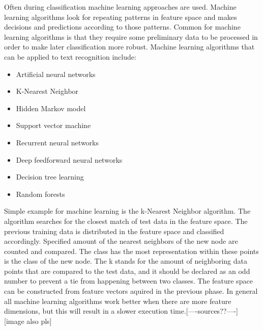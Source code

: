 \documentclass{article}
\begin{document}
        Often during classification machine learning approaches are used. Machine learning algorithms look for repeating patterns in feature space and makes decisions and predictions according to those patterns. Common for machine learning algorithms is that they require some preliminary data to be processed in order to make later classification more robust. Machine learning algorithms that can be applied to text recognition include:
        \begin{itemize}
          \item Artificial neural networks
          \item K-Nearest Neighbor
          \item Hidden Markov model
          \item Support vector machine
          \item Recurrent neural networks
          \item Deep feedforward neural networks
          \item Decision tree learning
          \item Random forests
        \end{itemize}
          Simple example for machine learning is the k-Nearest Neighbor algorithm. The algorithm searches for the closest match of test data in the feature space. The previous training data is distributed in the feature space and classified accordingly. Specified amount of the nearest neighbors of the new node are counted and compared. The class has the most representation within these points is the class of the new node. The k stands for the amount of neighboring data points that are compared to the test data, and it should be declared as an odd number to prevent a tie from happening between two classes. The feature space can be constructed from feature vectors aquired in the previous phase. In general all machine learning algorithms work better when there are more feature dimensions, but this will result in a slower execution time.[----sources??----] [image also pls]
\end{document}
